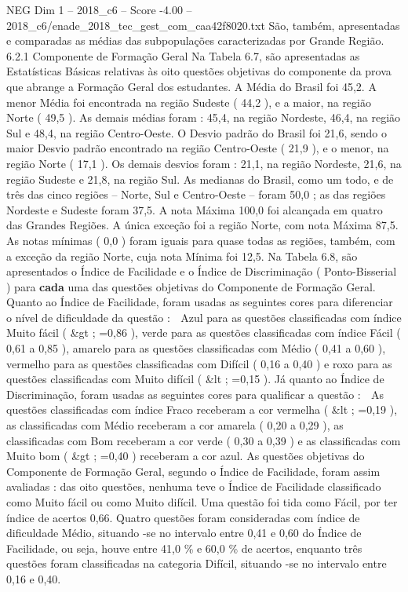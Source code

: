 \begin{textsample}{NEG Dim 1 – 2018\_c6 – Score -4.00 – 2018\_c6/enade\_2018\_tec\_gest\_com\_caa42f8020.txt}
São, também, apresentadas e comparadas as médias das subpopulações caracterizadas por Grande Região. 6.2.1 Componente de Formação Geral Na Tabela 6.7, são apresentadas as Estatísticas Básicas relativas às oito questões objetivas do componente da prova que abrange a Formação Geral dos estudantes.
A Média do Brasil foi 45,2.
A menor Média foi encontrada na região Sudeste ( 44,2 ), e a maior, na região Norte ( 49,5 ).
As demais médias foram : 45,4, na região Nordeste, 46,4, na região Sul e 48,4, na região Centro-Oeste.
O Desvio padrão do Brasil foi 21,6, sendo o maior Desvio padrão encontrado na região Centro-Oeste ( 21,9 ), e o menor, na região Norte ( 17,1 ).
Os demais desvios foram : 21,1, na região Nordeste, 21,6, na região Sudeste e 21,8, na região Sul.
As medianas do Brasil, como um todo, e de três das cinco regiões – Norte, Sul e Centro-Oeste – foram 50,0 ; as das regiões Nordeste e Sudeste foram 37,5.
A nota Máxima 100,0 foi alcançada em quatro das Grandes Regiões.
A única exceção foi a região Norte, com nota Máxima 87,5.
As notas mínimas ( 0,0 ) foram iguais para quase todas as regiões, também, com a exceção da região Norte, cuja nota Mínima foi 12,5.
Na Tabela 6.8, são apresentados o Índice de Facilidade e o Índice de Discriminação ( Ponto-Bisserial ) para \textbf{cada} uma das questões objetivas do Componente de Formação Geral.
Quanto ao Índice de Facilidade, foram usadas as seguintes cores para diferenciar o nível de dificuldade da questão :  Azul para as questões classificadas com índice Muito fácil ( \&gt ; =0,86 ), verde para as questões classificadas com índice Fácil ( 0,61 a 0,85 ), amarelo para as questões classificadas com Médio ( 0,41 a 0,60 ), vermelho para as questões classificadas com Difícil ( 0,16 a 0,40 ) e roxo para as questões classificadas com Muito difícil ( \&lt ; =0,15 ).
Já quanto ao Índice de Discriminação, foram usadas as seguintes cores para qualificar a questão :  As questões classificadas com índice Fraco receberam a cor vermelha ( \&lt ; =0,19 ), as classificadas com Médio receberam a cor amarela ( 0,20 a 0,29 ), as classificadas com Bom receberam a cor verde ( 0,30 a 0,39 ) e as classificadas com Muito bom ( \&gt ; =0,40 ) receberam a cor azul.
As questões objetivas do Componente de Formação Geral, segundo o Índice de Facilidade, foram assim avaliadas : das oito questões, nenhuma teve o Índice de Facilidade classificado como Muito fácil ou como Muito difícil.
Uma questão foi tida como Fácil, por ter índice de acertos 0,66.
Quatro questões foram consideradas com índice de dificuldade Médio, situando -se no intervalo entre 0,41 e 0,60 do Índice de Facilidade, ou seja, houve entre 41,0 \% e 60,0 \% de acertos, enquanto três questões foram classificadas na categoria Difícil, situando -se no intervalo entre 0,16 e 0,40.

\end{textsample}
